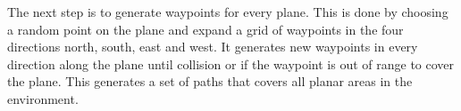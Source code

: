 The next step is to generate waypoints for every plane. This is done by choosing a random point on the plane and expand a grid of waypoints in the four directions north, south, east and west. It generates new waypoints in every direction along the plane until collision or if the waypoint is out of range to cover the plane. This generates a set of paths that covers all planar areas in the environment.




